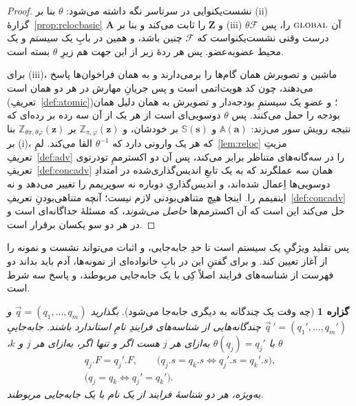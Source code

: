 \documentclass[10pt,oneside,openany]{book}
\newcommand{\Apid}{\mathbf{A}}
\newcommand{\Zpid}{\mathbf{Z}}
\newcommand{\F}{\mathcal{F}}
\newcommand{\bd}[1]{\mathbf{#1}}
\newcommand{\Aset}{\mathbb{A}}
\newcommand{\SimSet}{\mathbb{S}}
\newcommand{\ZenvSet}{\mathbb{Z}}
\newcommand{\op}[1]{\textnormal{\textsc{#1}}}
\theoremstyle{accentdef}
\theoremstyle{accentplain}
\newtheorem{proposition}[definition]{گزاره}
\begin{document}
\begin{proof}
نشست‌یکنوایی در سرتاسر نگه داشته می‌شود: $\theta$ بنا بر (ii)ِ
گزارهٔ~\ref{prop:relocbasic} $\Apid$ و $\Zpid$ را ثابت می‌کند و بنا بر
(iii)ِ آن $\op{global}$ را، پس $\theta\F$ درست وقتی نشست‌یکنواست که $\F$
چنین باشد، و همین در بابِ یک سیستم و یک محیط عضوبه‌عضو. پس هر ردهٔ زیر از
این جهت هم زیرِ $\theta$ بسته است.

برای (iii)، ماشین و تصویرش همان گام‌ها را برمی‌دارند و به همان فراخوان‌ها
پاسخ می‌دهند، چون کد هویت‌اتمی است و پس جریانِ مهارش در هر دو همان است
(تعریفِ~\ref{def:atomic})؛ و عضوِ یک سیستمِ بودجه‌دار و تصویرش به همان دلیل
همان بودجه را حمل می‌کنند. پس $\theta$ دوسویی‌ای است از هر یک از آن سه رده
بر رده‌ای که نتیجه رویش سور می‌زند: $\Aset(\bd{a})$ و $\SimSet(\bd{s})$ بر
خودشان، و $\ZenvSet_{\pi,\varphi}(\bd{z})$ بر
$\ZenvSet_{\theta\pi,\theta\varphi}(\bd{z})$ بنا بر (i)، که هر یک وارونی
دارد که $\theta^{-1}$ القا می‌کند. لمِ~\ref{lem:reloc} مزیتِ
تعریفِ~\ref{def:adv} را در سه‌گانه‌های متناظر برابر می‌کند، پس آن دو
اکسترممِ تو‌درتوی تعریفِ~\ref{def:concadv} همان سه عملگرند که به یک تابعِ
اندیس‌گذاری‌شده در امتدادِ دوسویی‌ها اِعمال شده‌اند، و اندیس‌گذاریِ دوباره نه
سوپریمم را تغییر می‌دهد و نه اینفیمم را. اینجا هیچ متناهی‌بودنی لازم نیست؛
آنچه متناهی‌بودنِ تعریفِ~\ref{def:concadv} حل می‌کند این است که آن
اکسترمم‌ها \emph{حاصل می‌شوند}، که مسئلهٔ جداگانه‌ای است و در هر دو سو
یکسان برقرار است.
\end{proof}

پس تقلید ویژگیِ یک سیستم است تا حدِ جابه‌جایی، و اثبات می‌تواند نشست و
نمونه را از آغاز تعیین کند. و برای گفتنِ این در بابِ خانواده‌ای از
نمونه‌ها، آدم باید بداند دو فهرست از شناسه‌های فرایند اصلاً کِی با یک
جابه‌جایی مربوطند، و پاسخ سه شرط است.

\begin{proposition}[چه وقت یک چندگانه به دیگری جابه‌جا می‌شود]\label{prop:orbit}
بگذارید $\vec q = (q_1,\dots,q_m)$ و $\vec q\,' = (q_1',\dots,q_m')$
چندگانه‌هایی از شناسه‌های فرایندِ نامِ استاندارد باشند. جابه‌جاییِ $\theta$ با
$\theta(q_j) = q_j'$ به‌ازای هر $j$ هست اگر و تنها اگر، به‌ازای هر $j$ و
$k$،
\[
  \begin{gathered}
  q_j.F = q_j'.F, \qquad
  \bigl(q_j.s = q_k.s \iff q_j'.s = q_k'.s\bigr), \\[3pt]
  \bigl(q_j = q_k \iff q_j' = q_k'\bigr) .
  \end{gathered}
\]
به‌ویژه، هر دو شناسهٔ فرایند از یک نام با یک جابه‌جایی مربوطند.
\end{proposition}
\end{document}
